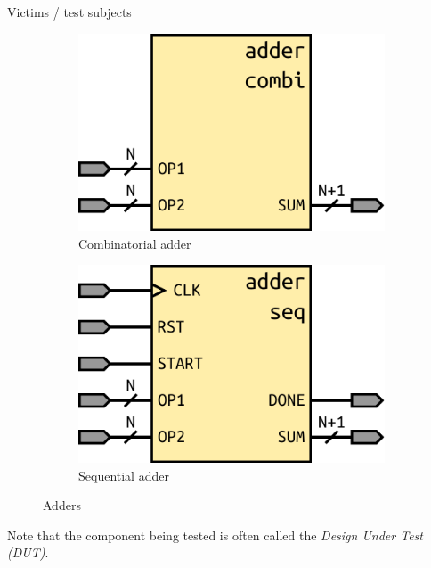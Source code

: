 \documentclass[lab]{course}
\begin{document}
\begin{section}{Victims / test subjects}
    \begin{figure}[!h]
        \centering
        \begin{subfigure}[t]{0.3\textwidth}
            \centering
            \includegraphics[width=1.0\textwidth]{figs/adder_combinatorial_interface.pdf}
            \caption{Combinatorial adder}
            \label{fig:adder_combinatorial_interface}
        \end{subfigure}
        \hspace{1em}
        \begin{subfigure}[t]{0.3\textwidth}
            \centering
            \includegraphics[width=1.0\textwidth]{figs/adder_sequential_interface.pdf}
            \caption{Sequential adder}
            \label{fig:adder_sequential_interface}
        \end{subfigure}
        \caption{Adders}
    \end{figure}

    Note that the component being tested is often called the \emph{Design Under Test (DUT)}.

\end{section}
\end{document}
